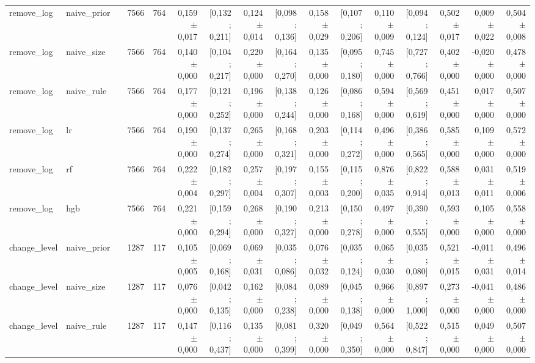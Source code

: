 \begin{table}[htbp]
{\begin{tabular}{llrrrrrrrrrrrrrr}
remove\_log & naive\_prior &  & 7566 & 764 & 0,159 $\pm$ 0,017 & [0,132 ; 0,211] & 0,124 $\pm$ 0,014 & [0,098 ; 0,136] & 0,158 $\pm$ 0,029 & [0,107 ; 0,206] & 0,110 $\pm$ 0,009 & [0,094 ; 0,124] & 0,502 $\pm$ 0,017 & 0,009 $\pm$ 0,022 & 0,504 $\pm$ 0,008 \\
remove\_log & naive\_size &  & 7566 & 764 & 0,140 $\pm$ 0,000 & [0,104 ; 0,217] & 0,220 $\pm$ 0,000 & [0,164 ; 0,270] & 0,135 $\pm$ 0,000 & [0,095 ; 0,180] & 0,745 $\pm$ 0,000 & [0,727 ; 0,766] & 0,402 $\pm$ 0,000 & -0,020 $\pm$ 0,000 & 0,478 $\pm$ 0,000 \\
remove\_log & naive\_rule &  & 7566 & 764 & 0,177 $\pm$ 0,000 & [0,121 ; 0,252] & 0,196 $\pm$ 0,000 & [0,138 ; 0,244] & 0,126 $\pm$ 0,000 & [0,086 ; 0,168] & 0,594 $\pm$ 0,000 & [0,569 ; 0,619] & 0,451 $\pm$ 0,000 & 0,017 $\pm$ 0,000 & 0,507 $\pm$ 0,000 \\
remove\_log & lr &  & 7566 & 764 & 0,190 $\pm$ 0,000 & [0,137 ; 0,274] & 0,265 $\pm$ 0,000 & [0,168 ; 0,321] & 0,203 $\pm$ 0,000 & [0,114 ; 0,272] & 0,496 $\pm$ 0,000 & [0,386 ; 0,565] & 0,585 $\pm$ 0,000 & 0,109 $\pm$ 0,000 & 0,572 $\pm$ 0,000 \\
remove\_log & rf &  & 7566 & 764 & 0,222 $\pm$ 0,004 & [0,182 ; 0,297] & 0,257 $\pm$ 0,004 & [0,197 ; 0,307] & 0,155 $\pm$ 0,003 & [0,115 ; 0,200] & 0,876 $\pm$ 0,035 & [0,822 ; 0,914] & 0,588 $\pm$ 0,013 & 0,031 $\pm$ 0,011 & 0,519 $\pm$ 0,006 \\
remove\_log & hgb &  & 7566 & 764 & 0,221 $\pm$ 0,000 & [0,159 ; 0,294] & 0,268 $\pm$ 0,000 & [0,190 ; 0,327] & 0,213 $\pm$ 0,000 & [0,150 ; 0,278] & 0,497 $\pm$ 0,000 & [0,390 ; 0,555] & 0,593 $\pm$ 0,000 & 0,105 $\pm$ 0,000 & 0,558 $\pm$ 0,000 \\
change\_level & naive\_prior &  & 1287 & 117 & 0,105 $\pm$ 0,005 & [0,069 ; 0,168] & 0,069 $\pm$ 0,031 & [0,035 ; 0,086] & 0,076 $\pm$ 0,032 & [0,035 ; 0,124] & 0,065 $\pm$ 0,030 & [0,035 ; 0,080] & 0,521 $\pm$ 0,015 & -0,011 $\pm$ 0,031 & 0,496 $\pm$ 0,014 \\
change\_level & naive\_size &  & 1287 & 117 & 0,076 $\pm$ 0,000 & [0,042 ; 0,135] & 0,162 $\pm$ 0,000 & [0,084 ; 0,238] & 0,089 $\pm$ 0,000 & [0,045 ; 0,138] & 0,966 $\pm$ 0,000 & [0,897 ; 1,000] & 0,273 $\pm$ 0,000 & -0,041 $\pm$ 0,000 & 0,486 $\pm$ 0,000 \\
change\_level & naive\_rule &  & 1287 & 117 & 0,147 $\pm$ 0,000 & [0,116 ; 0,437] & 0,135 $\pm$ 0,000 & [0,081 ; 0,399] & 0,320 $\pm$ 0,000 & [0,049 ; 0,350] & 0,564 $\pm$ 0,000 & [0,522 ; 0,847] & 0,515 $\pm$ 0,000 & 0,049 $\pm$ 0,000 & 0,507 $\pm$ 0,000 \\

\end{tabular}}
\end{table}
